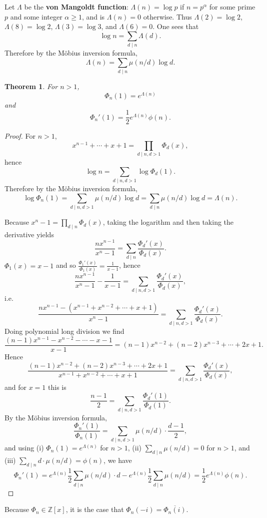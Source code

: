 \documentclass{article}
\newtheorem{theorem}{Theorem}
\theoremstyle{definition}
\begin{document}
Let $\Lambda$ be the \textbf{von Mangoldt function}: $\Lambda(n)=\log p$ if $n=p^\alpha$ for some prime $p$ and some integer
$\alpha \geq 1$, and is $\Lambda(n)=0$ otherwise. Thus $\Lambda(2)=\log 2$, $\Lambda(8)=\log 2$, $\Lambda(3)=\log 3$,
and $\Lambda(6) = 0$. One sees that
\[
\log n = \sum_{d \mid n} \Lambda(d).
\]
Therefore by the M\"obius inversion formula,
\[
\Lambda(n) = \sum_{d \mid n} \mu(n/d) \log d.
\]

\begin{theorem}
For $n>1$,
\[
\Phi_n(1) =  e^{\Lambda(n)}
\]
and
\[
\Phi_n'(1) =\frac{1}{2} e^{\Lambda(n)}  \phi(n).
\]
\label{specialvalues}
\end{theorem}
\begin{proof}
For $n>1$,
\[
x^{n-1}+\cdots+x+1 = \prod_{d \mid n, d>1} \Phi_d(x),
\]
hence
\[
\log n = \sum_{d \mid n, d>1} \log \Phi_d(1).
\]
Therefore by the M\"obius inversion formula,
\[
\log \Phi_n(1) = \sum_{d \mid n, d>1} \mu(n/d)  \log d = \sum_{d \mid n} \mu(n/d) \log d = \Lambda(n).
\]


Because $x^n-1 = \prod_{d \mid n} \Phi_d(x)$, taking the logarithm and then taking the derivative
yields
\[
\frac{nx^{n-1}}{x^n-1} = \sum_{d \mid n} \frac{\Phi_d'(x)}{\Phi_d(x)}.
\]
$\Phi_1(x) = x-1$ and so $\frac{\Phi_1'(x)}{\Phi_1(x)} = \frac{1}{x-1}$, hence
\[
\frac{nx^{n-1}}{x^n-1}  - \frac{1}{x-1} = \sum_{d \mid n, d>1} \frac{\Phi_d'(x)}{\Phi_d(x)},
\]
i.e.
\[
\frac{nx^{n-1} - (x^{n-1}+x^{n-2}+\cdots+x+1)}{x^n-1} = \sum_{d \mid n, d>1} \frac{\Phi_d'(x)}{\Phi_d(x)}.
\]
Doing polynomial long division we find
\[
\frac{(n-1)x^{n-1} - x^{n-2} - \cdots - x - 1}{x-1} = (n-1)x^{n-2} + (n-2)x^{n-3} + \cdots + 2x+1.
\]
Hence
\[
\frac{(n-1)x^{n-2} + (n-2)x^{n-3} + \cdots + 2x+1}{x^{n-1}+x^{n-2}+\cdots+x+1} =  \sum_{d \mid n, d>1} \frac{\Phi_d'(x)}{\Phi_d(x)},
\]
and for $x=1$ this is
\[
\frac{n-1}{2} = \sum_{d \mid n, d>1} \frac{\Phi_d'(1)}{\Phi_d(1)}.
\]
By the M\"obius inversion formula,
\[
\frac{\Phi_n'(1)}{\Phi_n(1)} = \sum_{d \mid n, d>1} \mu(n/d) \cdot  \frac{d-1}{2},
\]
and using (i) $\Phi_n(1) = e^{\Lambda(n)}$ for $n>1$, (ii) $\sum_{d \mid n} \mu(n/d) = 0$ for $n>1$,
and (iii) $\sum_{d \mid n} d \cdot \mu(n/d) = \phi(n)$, we have
\[
\Phi_n'(1) =  e^{\Lambda(n)} \frac{1}{2} \sum_{d \mid n} \mu(n/d) \cdot d -e^{\Lambda(n)} \frac{1}{2} \sum_{d \mid n} \mu(n/d)
=\frac{1}{2} e^{\Lambda(n)} \phi(n).
\]
\end{proof}





Because $\Phi_n \in \mathbb{Z}[x]$, it is the case that $\Phi_n(-i) = \overline{\Phi_n(i)}$.
\end{document}
